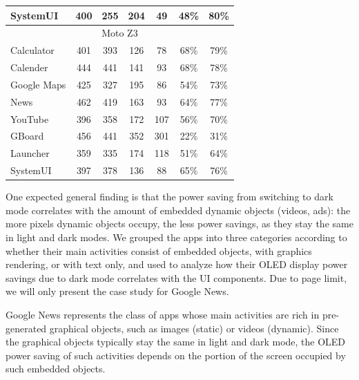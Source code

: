 \begin{table}[tp]
{\begin{tabular}{| l | c | c | c | c |c|c|}
	 SystemUI       &  400 &  255 &  204 &   49 &   48\% &   80\%  \\
	 \hline
         \multicolumn{7}{|c|}{Moto Z3} \\
	 \hline
	 Calculator	&  401 &  393 &  126 &   78 &   68\% &   79\% \\
	 Calender	&  444 &  441 &  141 &   93 &   68\% &   78\% \\
	 Google Maps	&  425 &  327 &  195 &   86 &   54\% &   73\% \\
	 News		&  462 &  419 &  163 &   93 &   64\% &   77\% \\
	 YouTube	&  396 &  358 &  172 &  107 &   56\% &   70\% \\
	 GBoard		&  456 &  441 &  352 &  301 &   22\% &   31\% \\
	 Launcher       &  359 &  335 &  174 &  118 &   51\% &   64\% \\
	 SystemUI       &  397 &  378 &  136 &   88 &   65\% &   76\% \\
	 \hline
\end{tabular}
}
\label{tab:Dark_vs_light_popular_google_apps}
\end{table}
\fi

%
One expected general finding is that
the power saving from switching to dark mode
correlates with the amount of embedded dynamic objects (\eg videos, ads):
the more pixels dynamic objects occupy, the less power savings, as they stay the same
in light and dark modes.
We grouped the apps  into three categories according to
whether their main activities consist of embedded objects, with graphics rendering, or
with text only, and used \name to analyze how 
their OLED display power savings due to dark mode correlates
with the UI components.
\fi
Due to page limit, we will only present the case study for Google News.

Google News
represents the class of apps whose main
activities are rich in pre-generated graphical objects, such as images
(static) or videos (dynamic). Since the graphical objects typically
stay the same in light and dark mode, the OLED power saving of
such activities depends on the portion of the screen occupied by such
embedded objects.

